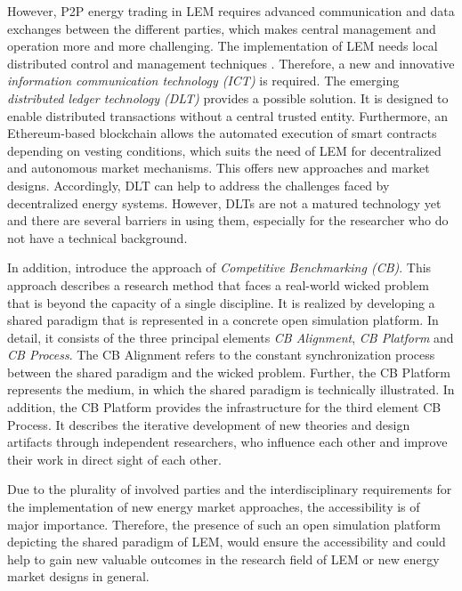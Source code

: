 However, P2P energy trading in LEM requires advanced communication and data exchanges between the different parties, 
which makes central management and operation more and more challenging. The implementation of LEM needs local 
distributed control and management techniques . 
Therefore, a new and innovative \textit{information communication technology (ICT)} is required.  
The emerging \textit{distributed ledger technology (DLT)} provides a possible solution. 
It is designed to enable distributed transactions without a central trusted entity. 
Furthermore, an Ethereum-based blockchain allows the automated execution of smart contracts depending 
on vesting conditions, which suits the need of LEM for decentralized and autonomous market mechanisms. 
This offers new approaches and market designs. Accordingly, DLT can help to address the challenges 
faced by decentralized energy systems. However, DLTs are not a matured technology yet and 
there are several barriers in using them, especially for the researcher who do not have a technical background. 

In addition,  introduce the approach of \textit{Competitive Benchmarking (CB)}. 
This approach describes a research method that faces a real-world wicked problem that is beyond the capacity of a single discipline. 
It is realized by developing a shared paradigm that is represented in a concrete open simulation platform. 
In detail, it consists of the three principal elements \textit{CB Alignment}, \textit{CB Platform} and \textit{CB Process}. 
The CB Alignment refers to the constant synchronization process between the shared paradigm and the wicked problem. 
Further, the CB Platform represents the medium, in which the shared paradigm is technically illustrated. 
In addition, the CB Platform provides the infrastructure for the third element CB Process. 
It describes the iterative development of new theories and design artifacts through independent researchers, 
who influence each other and improve their work in direct sight of each other. 

Due to the plurality of involved parties and the interdisciplinary requirements for the 
implementation of new energy market approaches, the accessibility is of major importance.
Therefore, the presence of such an open simulation platform depicting the shared paradigm of LEM, 
would ensure the accessibility and could help to gain new valuable outcomes in the research field 
of LEM or new energy market designs in general. 

